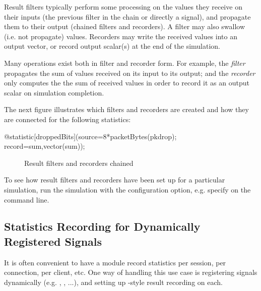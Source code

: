 Result filters typically perform some processing on the values they receive
on their inputs (the previous filter in the chain or directly a signal),
and propagate them to their output (chained filters and recorders). A
filter may also swallow (i.e. not propagate) values. Recorders may write
the received values into an output vector, or record output scalar(s)
at the end of the simulation.

Many operations exist both in filter and recorder form. For example, the
 \textit{filter} propagates the sum of values received on its
input to its output; and the  \textit{recorder} only computes the
the sum of received values in order to record it as an output scalar on
simulation completion.

The next figure illustrates which filters and recorders are created and how
they are connected for the following statistics:

\begin{ned}
@statistic[droppedBits](source=8*packetBytes(pkdrop); record=sum,vector(sum));
\end{ned}

\begin{figure}[htbp]
  \begin{center}
    
    \caption{Result filters and recorders chained}
  \end{center}
\end{figure}

\begin{hint}
To see how result filters and recorders have been set up for a particular
simulation, run the simulation with the 
configuration option, e.g. specify 
on the command line.
\end{hint}


\subsection{Statistics Recording for Dynamically Registered Signals}
\label{sec:simple-modules:statistic-recording-dynamic-signals}

It is often convenient to have a module record statistics per session, per
connection, per client, etc. One way of handling this use case is registering
signals dynamically (e.g. , , ...),
and setting up -style result recording on each.

